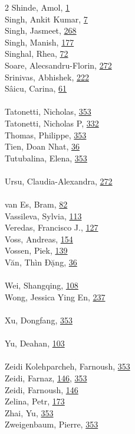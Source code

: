 \documentclass[11pt,oneside]{book}
\begin{document}
\begin{multicols}{2}
Shinde, Amol, \hyperlink{page.1}{1}\\
Singh, Ankit Kumar, \hyperlink{page.7}{7}\\
Singh, Jasmeet, \hyperlink{page.268}{268}\\
Singh, Manish, \hyperlink{page.177}{177}\\
Singhal, Rhea, \hyperlink{page.72}{72}\\
Soare, Alecsandru-Florin, \hyperlink{page.272}{272}\\
Srinivas, Abhishek, \hyperlink{page.222}{222}\\
Sâicu, Carina, \hyperlink{page.61}{61}\\
\\ %
Tatonetti, Nicholas, \hyperlink{page.353}{353}\\
Tatonetti, Nicholas P, \hyperlink{page.332}{332}\\
Thomas, Philippe, \hyperlink{page.353}{353}\\
Tien, Doan Nhat, \hyperlink{page.36}{36}\\
Tutubalina, Elena, \hyperlink{page.353}{353}\\
\\ %
Ursu, Claudia-Alexandra, \hyperlink{page.272}{272}\\
\\ %
van Es, Bram, \hyperlink{page.82}{82}\\
Vassileva, Sylvia, \hyperlink{page.113}{113}\\
Veredas, Francisco J., \hyperlink{page.127}{127}\\
Voss, Andreas, \hyperlink{page.154}{154}\\
Vossen, Piek, \hyperlink{page.139}{139}\\
Văn, Thìn Đặng, \hyperlink{page.36}{36}\\
\\ %
Wei, Shangqing, \hyperlink{page.108}{108}\\
Wong, Jessica Ying En, \hyperlink{page.237}{237}\\
\\ %
Xu, Dongfang, \hyperlink{page.353}{353}\\
\\ %
Yu, Deahan, \hyperlink{page.103}{103}\\
\\ %
Zeidi Kolehparcheh, Farnoush, \hyperlink{page.353}{353}\\
Zeidi, Farnaz, \hyperlink{page.146}{146}, \hyperlink{page.353}{353}\\
Zeidi, Farnoush, \hyperlink{page.146}{146}\\
Zelina, Petr, \hyperlink{page.173}{173}\\
Zhai, Yu, \hyperlink{page.353}{353}\\
Zweigenbaum, Pierre, \hyperlink{page.353}{353}\\
\\ %
\end{multicols}
\end{document}
